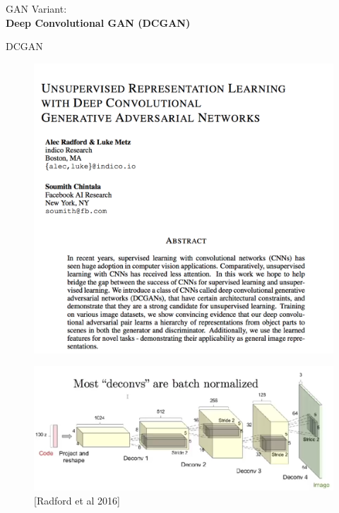 \begin{frame}{}
    \LARGE GAN Variant: \\[1.5ex] \textbf{Deep Convolutional GAN (DCGAN)}
\end{frame}

\begin{frame}[allowframebreaks]{DCGAN}
    \begin{figure}
        \centering
        \includegraphics[height=0.9\textheight,keepaspectratio]{images/gan/dcgan-paper.png}
    \end{figure}

    \framebreak

    \begin{figure}
        \centering
        \includegraphics[width=1.05\textwidth,keepaspectratio]{images/gan/dcgan-architecture.png}
        \small [Radford et al 2016]
    \end{figure}


\end{frame}
